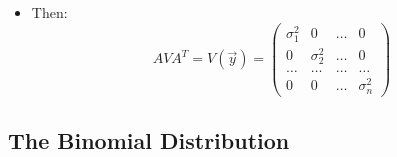 \begin{itemize}
    \item Then:
          \[ AVA^T = V(\vec{y}) = \begin{pmatrix}
                  \sigma_1^2 & 0          & \ldots & 0          \\
                  0          & \sigma_2^2 & \ldots & 0          \\
                  \ldots     & \ldots     & \ldots & \ldots     \\
                  0          & 0          & \ldots & \sigma_n^2
              \end{pmatrix} \]
\end{itemize}

\subsection{The Binomial Distribution}

